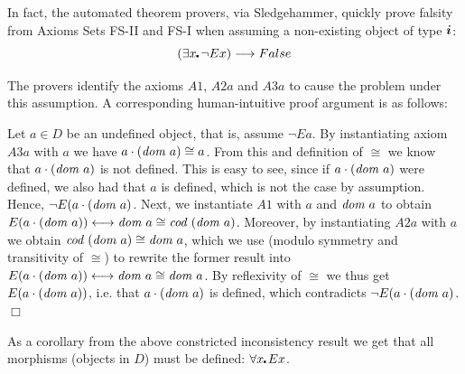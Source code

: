 In fact, the automated theorem provers, via Sledgehammer, quickly
prove falsity from Axioms Sets FS-II and FS-I when assuming a 
 non-existing object of type $\boldsymbol{i}$:
$$(\exists x\lambdot \neg E x) \imp False$$

The provers identify the axioms $A1$,
 $A2a$ and $A3a$ to cause the problem under this assumption. A
 corresponding  human-intuitive proof argument is as follows:
 
 Let $a\in D$ be an undefined object, that is, assume $\neg E a$.  By
 instantiating axiom $A3a$ with $a$ we have $a \cdot (\textit{dom \/} a) \cong a$.  From
 this and definition of $\cong$ we know that $a \cdot (\textit{dom \/} a)$ is not
 defined. This is easy to see, since if $a \cdot (\textit{dom \/} a)$ were defined, we
 also had that $a$ is defined, which is not the case by assumption.
  Hence, $\neg E (a \cdot (\textit{dom \/} a)$.
Next, we instantiate $A1$ with $a$ and $\textit{dom \/} a$ to obtain
   $E(a \cdot (\textit{dom \/} a)) \longleftrightarrow \textit{dom \/} a \cong \textit{cod \/}(\textit{dom \/} a)$. Moreover,
   by instantiating $A2a$ with $a$ we obtain $\textit{cod \/}(\textit{dom \/} a) \cong \textit{dom \/} a$,
   which we use (modulo symmetry and transitivity of $\cong$) to
   rewrite the former result into 
   $E(a \cdot (\textit{dom \/} a)) \longleftrightarrow \textit{dom \/} a \cong \textit{dom \/} a$. By reflexivity of
   $\cong$ we thus get $E(a \cdot (\textit{dom \/} a))$, i.e. that $a \cdot
   (\textit{dom \/} a)$ is defined, which contradicts $\neg E (a \cdot (\textit{dom \/}
   a)$. $\Box$

As a corollary from the above constricted inconsistency result we get
that all morphisms (objects in $D$) must be
defined: $\forall x\lambdot E x$.









